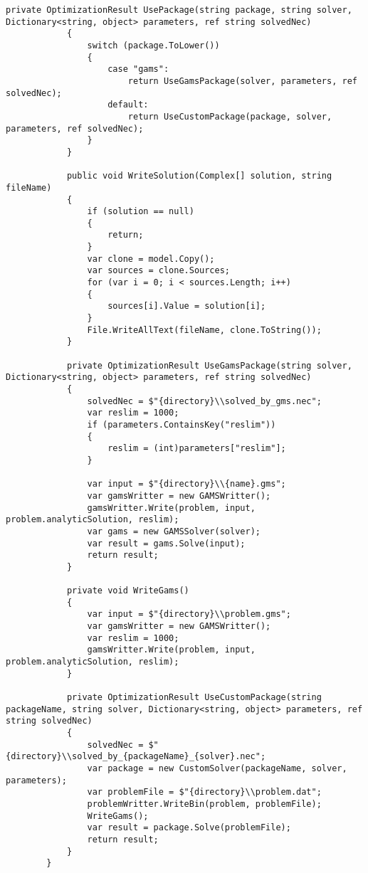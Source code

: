 \documentclass{scrartcl}
\begin{document}
\begin{lstlisting}[language={[Sharp]C}, caption={Experiment}, label={experiment}]
            private OptimizationResult UsePackage(string package, string solver, Dictionary<string, object> parameters, ref string solvedNec)
            {
                switch (package.ToLower())
                {
                    case "gams":
                        return UseGamsPackage(solver, parameters, ref solvedNec);
                    default:
                        return UseCustomPackage(package, solver, parameters, ref solvedNec);
                }
            }

            public void WriteSolution(Complex[] solution, string fileName)
            {
                if (solution == null)
                {
                    return;
                }
                var clone = model.Copy();
                var sources = clone.Sources;
                for (var i = 0; i < sources.Length; i++)
                {
                    sources[i].Value = solution[i];
                }
                File.WriteAllText(fileName, clone.ToString());
            }

            private OptimizationResult UseGamsPackage(string solver, Dictionary<string, object> parameters, ref string solvedNec)
            {
                solvedNec = $"{directory}\\solved_by_gms.nec";
                var reslim = 1000;
                if (parameters.ContainsKey("reslim"))
                {
                    reslim = (int)parameters["reslim"];
                }

                var input = $"{directory}\\{name}.gms";
                var gamsWritter = new GAMSWritter();
                gamsWritter.Write(problem, input, problem.analyticSolution, reslim);
                var gams = new GAMSSolver(solver);
                var result = gams.Solve(input);
                return result;
            }

            private void WriteGams()
            {
                var input = $"{directory}\\problem.gms";
                var gamsWritter = new GAMSWritter();
                var reslim = 1000;
                gamsWritter.Write(problem, input, problem.analyticSolution, reslim);
            }

            private OptimizationResult UseCustomPackage(string packageName, string solver, Dictionary<string, object> parameters, ref string solvedNec)
            {
                solvedNec = $"{directory}\\solved_by_{packageName}_{solver}.nec";
                var package = new CustomSolver(packageName, solver, parameters);
                var problemFile = $"{directory}\\problem.dat";
                problemWritter.WriteBin(problem, problemFile);
                WriteGams();
                var result = package.Solve(problemFile);
                return result;
            }
        }


\end{lstlisting}
\end{document}
